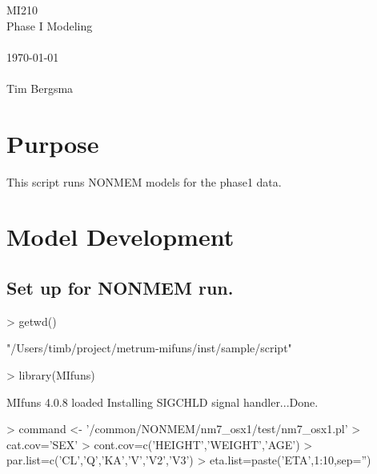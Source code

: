 
\usepackage{Sweave}

 

\vspace*{2cm}
\begin{center}
{\Huge MI210}\\
\vspace{1.5cm}
{\Large Phase I Modeling}\\
~\\
\today\\
~\\
Tim Bergsma\\
\end{center}
\newpage

\section{Purpose}
This script runs NONMEM models for the phase1 data.
\section{Model Development}
\subsection{Set up for NONMEM run.}
\begin{Schunk}
\begin{Sinput}
> getwd()
\end{Sinput}
\begin{Soutput}
[1] "/Users/timb/project/metrum-mifuns/inst/sample/script"
\end{Soutput}
\begin{Sinput}
> library(MIfuns)
\end{Sinput}
\begin{Soutput}
MIfuns 4.0.8 loaded
Installing SIGCHLD signal handler...Done.
\end{Soutput}
\begin{Sinput}
> command <- '/common/NONMEM/nm7_osx1/test/nm7_osx1.pl'
> cat.cov='SEX'
> cont.cov=c('HEIGHT','WEIGHT','AGE')
> par.list=c('CL','Q','KA','V','V2','V3')
> eta.list=paste('ETA',1:10,sep='')
\end{Sinput}
\end{Schunk}
